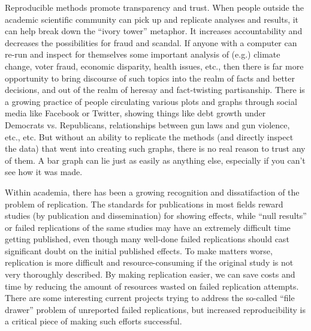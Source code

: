 \documentclass{book}
\begin{document}
Reproducible methods promote transparency and trust.  When people outside the academic scientific community can pick up and replicate analyses and results, it can help break down the ``ivory tower'' metaphor.  It increases accountability and decreases the possibilities for fraud and scandal. If anyone with a computer can re-run and inspect for themselves some important analysis of (e.g.) climate change, voter fraud, economic disparity, health issues, etc., then there is far more opportunity to bring discourse of such topics into the realm of facts and better decisions, and out of the realm of heresay and fact-twisting partisanship.  There is a growing practice of people circulating various plots and graphs through social media like Facebook or Twitter, showing things like debt growth under Democrats vs. Republicans, relationships between gun laws and gun violence, etc., etc.  But without an ability to replicate the methods (and directly inspect the data) that went into creating such graphs, there is no real reason to trust any of them.  A bar graph can lie just as easily as anything else, especially if you can't see how it was made. 

Within academia, there has been a growing recognition and dissatifaction of the problem of replication. The standards for publications in most fields reward studies (by publication and dissemination) for showing effects, while ``null results'' or failed replications of the same studies may have an extremely difficult time getting published, even though many well-done failed replications should cast significant doubt on the initial published effects. To make matters worse, replication is more difficult and resource-consuming if the original study is not very thoroughly described. By making replication easier, we can save costs and time by reducing the amount of resources wasted on failed replication attempts. There are some interesting current projects trying to address the so-called ``file drawer'' problem of unreported failed replications, but increased reproducibility is a critical piece of making such efforts successful.
\end{document}
